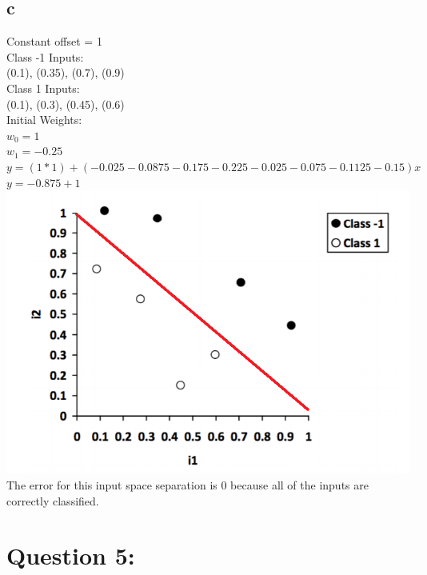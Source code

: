 \documentclass[11pt, oneside]{article}   	%
\begin{document}
\begin{flushleft}
\subsection*{c}
Constant offset = 1\\
Class -1 Inputs:\\
(0.1), (0.35), (0.7), (0.9)\\
Class 1 Inputs: \\
(0.1), (0.3), (0.45), (0.6)\\
Initial Weights:\\
$w_0 = 1$\\
$w_1 = -0.25$\\
$y=(1*1)+(-0.025-0.0875-0.175-0.225-0.025-0.075-0.1125-0.15)x$\\
$y=-0.875+1$\\
\includegraphics[]{q4_c_final.png}
\\
The error for this input space separation is 0 because all of the inputs are correctly classified.\\
\section*{Question 5:}

\end{flushleft}
\end{document}
